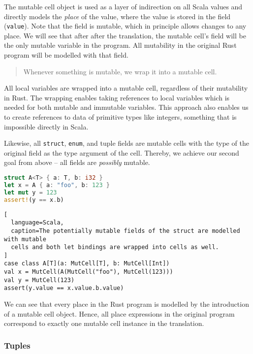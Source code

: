 The mutable cell object is used as a layer of indirection on all Scala
values and directly models the \emph{place} of the value, where the
value is stored in the field (\passthrough{\lstinline!value!}). Note
that the field is mutable, which in principle allows changes to any
place. We will see that after after the translation, the mutable cell's
field will be the only mutable variable in the program. All mutability
in the original Rust program will be modelled with that field.

\begin{quote}
Whenever something is mutable, we wrap it into a mutable cell.
\end{quote}

All local variables are wrapped into a mutable cell, regardless of their
mutability in Rust. The wrapping enables taking references to local
variables which is needed for both mutable and immutable variables. This
approach also enables us to create references to data of primitive types
like integers, something that is impossible directly in Scala.

Likewise, all \lstinline!struct!, \lstinline!enum!, and tuple fields are mutable
cells with the type of the original field as the type argument of the cell.
Thereby, we achieve our second goal from above -- all fields are \emph{possibly}
mutable.

\begin{lstlisting}[language=Rust, caption=Some example Rust code.]
struct A<T> { a: T, b: i32 }
let x = A { a: "foo", b: 123 }
let mut y = 123
assert!(y == x.b)
\end{lstlisting}

\begin{lstlisting}[
  language=Scala,
  caption=The potentially mutable fields of the struct are modelled with mutable
  cells and both let bindings are wrapped into cells as well.
]
case class A[T](a: MutCell[T], b: MutCell[Int])
val x = MutCell(A(MutCell("foo"), MutCell(123)))
val y = MutCell(123)
assert(y.value == x.value.b.value)
\end{lstlisting}

We can see that every place in the Rust program is modelled by the
introduction of a mutable cell object. Hence, all place expressions in
the original program correspond to exactly one mutable cell instance in
the translation.

\subsubsection{Tuples}

